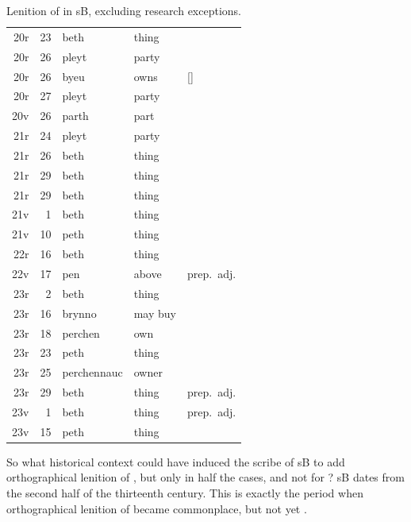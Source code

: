 \begin{table}[h]
  \centering
  \begin{tabular}{ddwql}
    \toprule
     &  &  &  &  \\
    \midrule
    20r & 23 & beth & thing &  \\
    20r & 26 & pleyt & party &  \\
    20r & 26 & byeu & owns & [] \\
    20r & 27 & pleyt & party &  \\
    20v & 26 & parth & part &  \\
    21r & 24 & pleyt & party &  \\
    21r & 26 & beth & thing &  \\
    21r & 29 & beth & thing &  \\
    21r & 29 & beth & thing &  \\
    21v & 1 & beth & thing &  \\
    21v & 10 & peth & thing &  \\
    22r & 16 & beth & thing &  \\
    22v & 17 & pen & above & prep.\ adj. \\
    23r & 2 & beth & thing &  \\
    23r & 16 & brynno & may buy &  \\
    23r & 18 & perchen & own &  \\
    23r & 23 & peth & thing &  \\
    23r & 25 & perchennauc & owner &  \\
    23r & 29 & beth & thing & prep.\ adj. \\
    23v & 1 & beth & thing & prep.\ adj. \\
    23v & 15 & peth & thing &  \\
    \bottomrule
  \end{tabular}%
  \caption{Lenition of  in \gls{sB}, excluding research exceptions.}
  \label{tab:lenpsbexre}%
\end{table}%


So what historical context could have induced the scribe of \gls{sB} to add orthographical lenition of , but only in half the cases, and not for ? \Gls{sB} dates from the second half of the thirteenth century. This is exactly the period when orthographical lenition of  became commonplace, but not yet .

